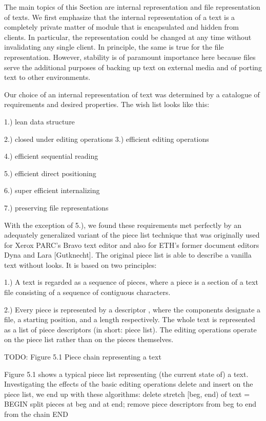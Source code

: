 The main topics of this Section are internal representation and file
representation of texts. We first emphasize that the internal
representation of a text is a completely private matter of module
 that is encapsulated and hidden from clients. In particular, the
representation could be changed at any time without invalidating any
single client. In principle, the same is true for the file
representation. However, stability is of paramount importance here
because files serve the additional purposes of backing up text on
external media and of porting text to other environments.

Our choice of an internal representation of text was determined by a catalogue of requirements and desired properties. The wish list looks like this:

1.) lean data structure

2.) closed under editing operations 3.) efficient editing operations

4.) efficient sequential reading

5.) efficient direct positioning

6.) super efficient internalizing

7.) preserving file representations

\noindent With the exception of 5.), we found these requirements met
perfectly by an adequately generalized variant of the piece list
technique that was originally used for Xerox PARC's Bravo text editor
and also for ETH's former document editors Dyna and Lara
[Gutknecht]. The original piece list is able to describe a vanilla
text without looks. It is based on two principles:


1.) A text is regarded as a sequence of pieces, where a piece is a
section of a text file consisting of a sequence of contiguous
characters.

2.) Every piece is represented by a descriptor , where
the components designate a file, a starting position, and a length
respectively. The whole text is represented as a list of piece
descriptors (in short: piece list). The editing operations operate on
the piece list rather than on the pieces themselves.

TODO: Figure 5.1 Piece chain representing a text

Figure 5.1 shows a typical piece list representing (the current state
of) a text. Investigating the effects of the basic editing operations
delete and insert on the piece list, we end up with these algorithms:
\begintt
delete stretch [beg, end) of text = BEGIN
  split pieces at beg and at end;
  remove piece descriptors from beg to end from the chain
END
  
